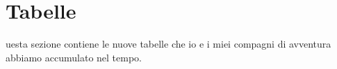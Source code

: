 \chapter{Tabelle}
uesta sezione contiene le nuove tabelle che io e i miei compagni di avventura abbiamo accumulato nel tempo. 



